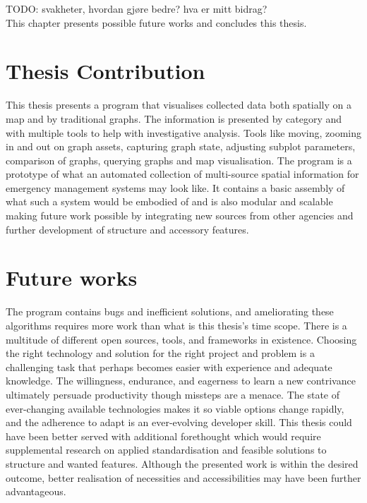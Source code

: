 TODO: svakheter, hvordan gjøre bedre? hva er mitt bidrag?  \\

This chapter presents possible future works and concludes this thesis.

\section{Thesis Contribution}
This thesis presents a program that visualises collected data both spatially on a map and by traditional graphs. The information is presented by category and with multiple tools to help with investigative analysis. Tools like moving, zooming in and out on graph assets, capturing graph state, adjusting subplot parameters, comparison of graphs, querying graphs and map visualisation. The program is a prototype of what an automated collection of multi-source spatial information for emergency management systems may look like. It contains a basic assembly of what such a system would be embodied of and is also modular and scalable making future work possible by integrating new sources from other agencies and further development of structure and accessory features.

\section{Future works}
The program contains bugs and inefficient solutions, and ameliorating these algorithms requires more work than what is this thesis's time scope. There is a multitude of different open sources, tools, and frameworks in existence. Choosing the right technology and solution for the right project and problem is a challenging task that perhaps becomes easier with experience and adequate knowledge. The willingness, endurance, and eagerness to learn a new contrivance ultimately persuade productivity though missteps are a menace. The state of ever-changing available technologies makes it so viable options change rapidly, and the adherence to adapt is an ever-evolving developer skill. This thesis could have been better served with additional forethought which would require supplemental research on applied standardisation and feasible solutions to structure and wanted features. Although the presented work is within the desired outcome, better realisation of necessities and accessibilities may have been further advantageous.

